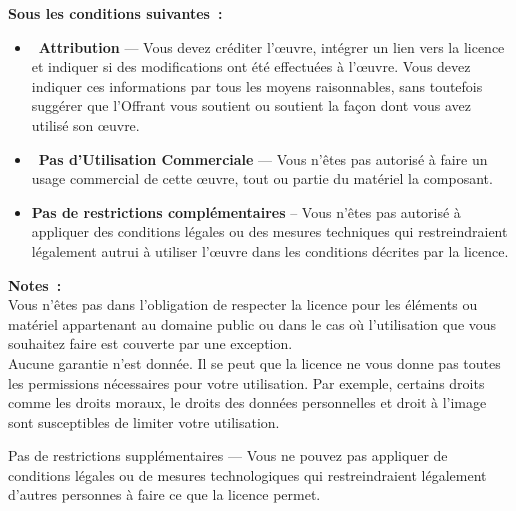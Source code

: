\documentclass[10pt]{book}
\begin{document}
\textbf{Sous les conditions suivantes~:}\\
  \begin{itemize}
    \item[] \faCreativeCommonsBy\ \textbf{Attribution} — Vous devez créditer l'œuvre, intégrer
    un lien vers la licence et indiquer si des modifications ont été effectuées à l'œuvre. Vous
    devez indiquer ces informations par tous les moyens raisonnables, sans toutefois suggérer
    que l'Offrant vous soutient ou soutient la façon dont vous avez utilisé son œuvre.\\

    \item[] \faCreativeCommonsNc\ \textbf{Pas d’Utilisation Commerciale} — Vous n'êtes pas
    autorisé à faire un usage commercial de cette œuvre, tout ou partie du matériel la
    composant.

    \item[] \textbf{Pas de restrictions complémentaires} -- Vous n'êtes pas autorisé à appliquer
    des conditions légales ou des mesures techniques qui restreindraient légalement autrui à
    utiliser l'œuvre dans les conditions décrites par la licence.\\
  \end{itemize}

\newpage

\textbf{Notes~:}\\

Vous n'êtes pas dans l'obligation de respecter la licence pour les éléments ou matériel
appartenant au domaine public ou dans le cas où l'utilisation que vous souhaitez faire est
couverte par une exception.\\

Aucune garantie n'est donnée. Il se peut que la licence ne vous donne pas toutes les permissions
nécessaires pour votre utilisation. Par exemple, certains droits comme les droits moraux, le
droits des données personnelles et droit à l'image sont susceptibles de limiter votre
utilisation.


Pas de restrictions supplémentaires — Vous ne pouvez pas appliquer de conditions légales ou de mesures technologiques qui restreindraient légalement d'autres personnes
à faire ce que la licence permet.

\newpage
\end{document}
